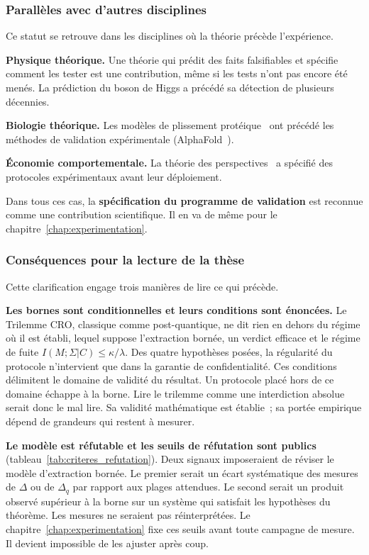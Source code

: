 \begin{sloppypar}
\subsubsection{Parall\`eles avec d'autres disciplines}

Ce statut se retrouve dans les disciplines o\`u la th\'eorie pr\'ec\`ede
l'exp\'erience.

\textbf{Physique th\'eorique.} Une th\'eorie qui pr\'edit des faits
falsifiables et sp\'ecifie comment les tester est une contribution,
m\^eme si les tests n'ont pas encore \'et\'e men\'es. La pr\'ediction du
boson de Higgs a pr\'ec\'ed\'e sa d\'etection de plusieurs d\'ecennies.

\textbf{Biologie th\'eorique.} Les mod\`eles de plissement
prot\'eique~\cite{Anfinsen1973} ont pr\'ec\'ed\'e les m\'ethodes de
validation exp\'erimentale (AlphaFold~\cite{Jumper2021}).

\textbf{\'Economie comportementale.} La th\'eorie des
perspectives~\cite{Kahneman1979} a sp\'ecifi\'e des protocoles
exp\'erimentaux avant leur d\'eploiement.

Dans tous ces cas, la \textbf{sp\'ecification du programme de
validation} est reconnue comme une contribution scientifique. Il
en va de m\^eme pour le chapitre~\ref{chap:experimentation}.

\subsubsection{Cons\'equences pour la lecture de la th\`ese}

Cette clarification engage trois mani\`eres de lire ce qui pr\'ec\`ede.

\textbf{Les bornes sont conditionnelles et leurs conditions sont
\'enonc\'ees.} Le Trilemme CRO, classique comme post-quantique, ne dit rien
en dehors du r\'egime o\`u il est \'etabli, lequel suppose l'extraction born\'ee, un verdict
efficace et le r\'egime de fuite $I(M;\Sigma|C) \leq \kappa/\lambda$. Des quatre hypoth\`eses
pos\'ees, la r\'egularit\'e du protocole n'intervient que dans la garantie de
confidentialit\'e. Ces conditions d\'elimitent le domaine de validit\'e du
r\'esultat. Un protocole plac\'e hors de ce domaine \'echappe \`a la
borne. Lire le trilemme comme une interdiction absolue serait donc le
mal lire. Sa validit\'e math\'ematique est \'etablie~; sa port\'ee
empirique d\'epend de grandeurs qui restent \`a mesurer.

\textbf{Le mod\`ele est r\'efutable et les seuils de r\'efutation sont
publics} (tableau~\ref{tab:criteres_refutation}). Deux signaux imposeraient de r\'eviser le mod\`ele
d'extraction born\'ee. Le premier serait un \'ecart syst\'ematique des mesures de $\Delta$
ou de $\Delta_q$ par rapport aux plages attendues. Le second serait un
produit observ\'e sup\'erieur \`a la borne sur un syst\`eme qui satisfait les
hypoth\`eses du th\'eor\`eme. Les
mesures ne seraient pas r\'einterpr\'et\'ees. Le chapitre~\ref{chap:experimentation} fixe ces seuils
avant toute campagne de mesure. Il devient impossible de les ajuster apr\`es
coup.


\end{sloppypar}
